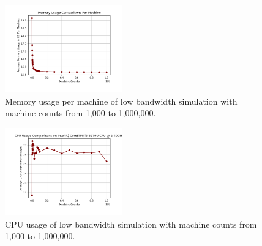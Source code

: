 \documentclass[journal]{IEEEtran} %
\newcommand{\imagewidth}{0.45\textwidth}
\begin{document}
\begin{figure}[H]
    \centerline{\includegraphics[width=\imagewidth]{Images/mem_usage_per_machine_low_band_thousand_to_million.png}}
    \caption{Memory usage per machine of low bandwidth simulation with machine counts from 1,000 to 1,000,000.}
    \label{fig:low_band_memory_per_machine_one_to_million}
\end{figure}

\begin{figure}[H]
    \centerline{\includegraphics[width=\imagewidth]{Images/CPU_usage_low_band.png}}
    \caption{CPU usage of low bandwidth simulation with machine counts from 1,000 to 1,000,000.}
    \label{fig:low_band_cpu_one_to_million}
\end{figure}
\end{document}
